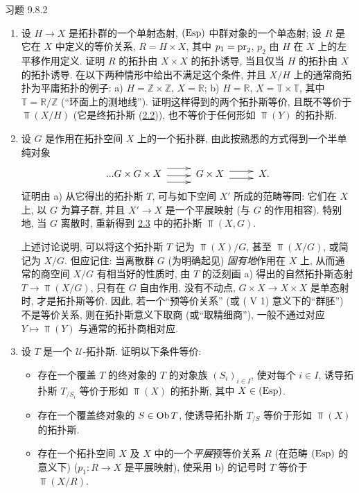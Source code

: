 \begin{enonce*}[remark]{习题 9.8.2}
\begin{enumerate}
\item 设 $H\rightarrow X$ 是拓扑群的一个单射态射,
\ie $(\operatorname{Esp})$ 中群对象的一个单态射;
设 $R$ 是它在 $X$ 中定义的等价关系,
\ie $R=H\times X$, 其中 $p_1=\operatorname{pr}_2$,
$p_2$ 由 $H$ 在 $X$ 上的左平移作用定义.
证明 $R$ 的拓扑由 $X\times X$ 的拓扑诱导,
当且仅当 $H$ 的拓扑由 $X$ 的拓扑诱导.
在以下两种情形中给出不满足这个条件,
并且 $X/H$ 上的通常商拓扑为平庸拓扑的例子:
a) $H=\mathbb{Z}\times\mathbb{Z}$, $X=\mathbb{R}$;
b) $H=\mathbb{R}$, $X=\mathbb{T}\times\mathbb{T}$,
其中 $\mathbb{T}=\mathbb{R}/\mathbb{Z}$ (“环面上的测地线”).
证明这样得到的两个拓扑斯等价,
且既不等价于 $\Top(X/H)$
(它是终拓扑斯 (\hyperref[IV.subsec2.2]{2.2})),
也不等价于任何形如 $\Top(Y)$ 的拓扑斯.

\item 设 $G$ 是作用在拓扑空间 $X$ 上的一个拓扑群,
由此按熟悉的方式得到一个半单纯对象
\[
\xymatrix@M=.2cm{ ... G\times G \times X
\ar@<6pt>[r]\ar@<-1.5pt>[r]\ar@<-8pt>[r] &
  G\times X \ar@<3pt>[r] \ar@<-4pt>[r] & X.
}
\]
证明\pageoriginale 由 a) 从它得出的拓扑斯 $T$,
可与如下空间 $X'$ 所成的范畴等同:
它们在 $X$ 上, 以 $G$ 为算子群,
并且 $X'\rightarrow X$ 是一个平展映射 (与 $G$ 的作用相容).
特别地, 当 $G$ 离散时,
重新得到 \hyperref[IV.subsec2.3]{2.3} 中的拓扑斯 $\Top(X,G)$.

上述讨论说明, 可以将这个拓扑斯 $T$
记为 $\Top(X)/G$, 甚至 $\Top(X/G)$, 或简记为 $X/G$.
但应记住: 当离散群 $G$ (为明确起见) \emph{固有地}作用在 $X$ 上,
从而通常的商空间 $X/G$ 有相当好的性质时,
由 $T$ 的泛刻画 a) 得出的自然拓扑斯态射 $T\rightarrow\Top(X/G)$,
只有在 $G$ 自由作用,
\ie 没有不动点, \ie $G\times X\rightarrow X\times X$ 是单态射时,
才是拓扑斯等价.
因此, 若一个“预等价关系”
(或 ( V 1) 意义下的“群胚”) 不是等价关系,
则在拓扑斯意义下取商 (或“取精细商”),
一般不通过对应 $Y\mapsto\Top(Y)$ 与通常的拓扑商相对应.

\item 设 $T$ 是一个 $𝒰$-拓扑斯. 证明以下条件等价:
\begin{itemize}
\item[(i)] 存在一个覆盖 $T$ 的终对象的 $T$ 的对象族 $(S_i)_{i\in I}$,
使对每个 $i\in I$,
诱导拓扑斯 $T_{/S_i}$ 等价于形如 $\Top(X)$ 的拓扑斯,
其中 $X\in(\operatorname{Esp})$.

\item[${\rm (i')}$] 存在一个覆盖终对象的 $S\in\operatorname{Ob} T$,
使诱导拓扑斯 $T_{/S}$ 等价于形如 $\Top(X)$ 的拓扑斯.

\item[(ii)] 存在一个拓扑空间 $X$ 及 $X$ 中的一个\emph{平展}预等价关系 $R$
(在范畴 $(\operatorname{Esp})$ 的意义下)
(\ie $p_1:R\rightarrow X$ 是平展映射),
使采用 b) 的记号时 $T$ 等价于 $\Top(X/R)$.
\end{itemize}


\end{enumerate}
\end{enonce*}
